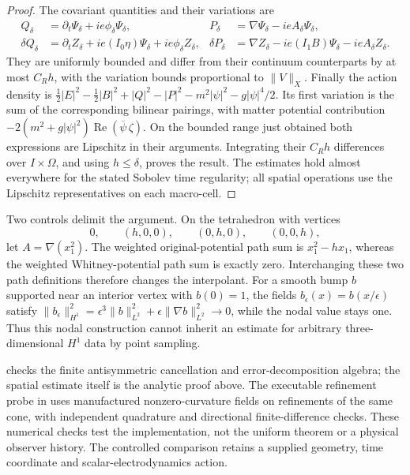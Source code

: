 \begin{proof}
The covariant quantities and their variations are
\begin{align*}
 Q_\delta&=\partial_t\Psi_\delta+ie\phi_\delta\Psi_\delta,&
 P_\delta&=\nabla\Psi_\delta-ieA_\delta\Psi_\delta,\\
 \delta Q_\delta&=\partial_tZ_\delta
       +ie(I_0\eta)\Psi_\delta+ie\phi_\delta Z_\delta,&
 \delta P_\delta&=\nabla Z_\delta
       -ie(I_1B)\Psi_\delta-ieA_\delta Z_\delta.
\end{align*}
They are uniformly bounded and differ from their continuum counterparts
by at most \(C_Rh\), with the variation bounds proportional to
\(\|V\|_X\). Finally the action density is
\(\tfrac12|E|^2-\tfrac12|B|^2+|Q|^2-|P|^2
-m^2|\psi|^2-g|\psi|^4/2\).
Its first variation is the sum of the corresponding bilinear pairings,
with matter potential contribution
\(-2(m^2+g|\psi|^2)\operatorname{Re}(\overline\psi\,\zeta)\).
On the bounded range just obtained both expressions are Lipschitz in their
arguments. Integrating their \(C_Rh\) differences over
\(I\times\Omega\), and using \(h\leq\delta\), proves the result.
The estimates hold almost everywhere for the stated Sobolev time regularity;
all spatial operations use the Lipschitz representatives on each macro-cell.
\end{proof}

Two controls delimit the argument. On the tetrahedron with vertices
\[
 0,\qquad(h,0,0),\qquad(0,h,0),\qquad(0,0,h),
\]
let \(A=\nabla(x_1^2)\).
The weighted original-potential path sum is \(x_1^2-hx_1\), whereas
the weighted Whitney-potential path sum is exactly zero. Interchanging
these two path definitions therefore changes the interpolant. For
a smooth bump \(b\) supported near an interior vertex with
\(b(0)=1\), the fields \(b_\epsilon(x)=b(x/\epsilon)\) satisfy
\(\|b_\epsilon\|_{H^1}^2=\epsilon^3\|b\|_{L^2}^2
+\epsilon\|\nabla b\|_{L^2}^2\to0\), while the nodal value stays
one. Thus this nodal construction cannot inherit an estimate for arbitrary
three-dimensional \(H^1\) data by point sampling.

 checks the finite
antisymmetric cancellation and error-decomposition algebra; the spatial
estimate itself is the analytic proof above. The executable refinement
probe in 
uses manufactured nonzero-curvature fields on refinements of the same cone,
with independent quadrature and directional finite-difference checks.
These numerical checks test the implementation, not the uniform theorem
or a physical observer history. The controlled comparison retains a
supplied geometry, time coordinate and scalar-electrodynamics action.
